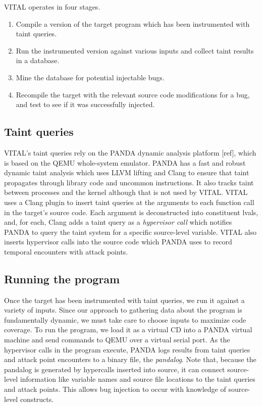 VITAL operates in four stages.

\begin{enumerate}
\item Compile a version of the target program which has been instrumented with taint queries.
\item Run the instrumented version against various inputs and collect taint results  in a database.
\item Mine the database for potential injectable bugs.
\item Recompile the target with the relevant source code modifications for a bug, and test to see if it was successfully injected.
\end{enumerate}

\subsection{Taint queries}
VITAL's taint queries rely on the PANDA dynamic analysis platform [ref], which is based on the QEMU whole-system emulator.
PANDA has a fast and robust dynamic taint analysis which uses LLVM lifting and Clang to ensure that taint propagates through library code and uncommon instructions.
It also tracks taint between processes and the kernel although that is not used by VITAL.
VITAL uses a Clang plugin to insert taint queries at the arguments to each function call in the target's source code.
Each argument is deconstructed into constituent lvals, and, for each, Clang adds a taint query as a \emph{hypervisor call} which notifies PANDA to query the taint system for a specific source-level variable.
VITAL also inserts hypervisor calls into the source code which PANDA uses to record temporal encounters with attack points.

\subsection{Running the program}
Once the target has been instrumented with taint queries, we run it against a variety of inputs.
Since our approach to gathering data about the program is fundamentally dynamic, we must take care to choose inputs to maximize code coverage.
To run the program, we load it as a virtual CD into a PANDA virtual machine and send commands to QEMU over a virtual serial port.
As the hypervisor calls in the program execute, PANDA logs results from taint queries and attack point encounters to a binary file, the \emph{pandalog}.
Note that, because the pandalog is generated by hypercalls inserted into source, it can connect source-level information like variable names and source file locations to the taint queries and attack points.
This allows bug injection to occur with knowledge of source-level constructs. 

